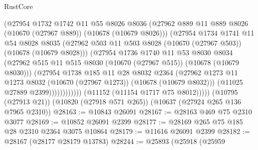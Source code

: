 \begin{lexlean}{RustCore}
\begin{coremodule}
                        (@27954
                          @1732
                          @1742
                          @11
                          @55
                          @8026
                          @8036
                          (@27962
                            @889
                            @11
                            @889
                            @8026
                            (@10670 (@27967 @889))
                            (@10678 (@10679 @8026)))
                          (@27954
                            @1734
                            @1741
                            @11
                            @54
                            @8028
                            @8035
                            (@27962
                              @503
                              @11
                              @503
                              @8028
                              (@10670 (@27967 @503))
                              (@10678 (@10679 @8028)))
                            (@27954
                              @1736
                              @1740
                              @11
                              @53
                              @8030
                              @8034
                              (@27962
                                @515
                                @11
                                @515
                                @8030
                                (@10670 (@27967 @515))
                                (@10678 (@10679 @8030)))
                              (@27954
                                @1738
                                @185
                                @11
                                @28
                                @8032
                                @2364
                                (@27962
                                  @1273
                                  @11
                                  @1273
                                  @8032
                                  (@10670 (@27967 @1273))
                                  (@10678 (@10679 @8032)))
                                (@11025 @27889 @2399))))))))))))
          (@11152 (@11154 @1717 @75 @8012)))))
    (@10795 (@27913 @21))
    (@10820 (@27918 @571 @265))
    (@10637 (@27924 @265 @136 @7965 @2310))
@28163 := @10843 @26091
@28167 := @28163 @469 @75 @2310 @3077
@28169 := @10852 @26091 @2399
@28177 := @28169 @265 @75 @185 @28 @2310 @2364 @3075 @10864
@28179 := @11616 @26091 @2399
@28182 := @28167 (@28177 @28179 @13783)
@28244 := @25893
    (@25918
      (@25959

\end{coremodule}
\end{lexlean}
